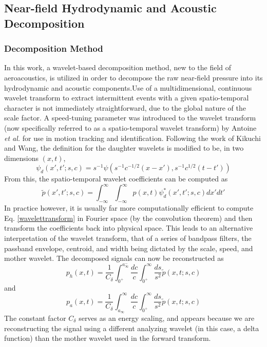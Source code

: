 \documentclass[english]{aiaa-tc}
\begin{document}
\subsection{Near-field Hydrodynamic and Acoustic Decomposition}
\subsubsection{Decomposition Method}
In this work, a wavelet-based decomposition method, new to the field of aeroacoustics, is utilized in order to decompose the raw near-field pressure into its hydrodynamic and acoustic components.Use of a multidimensional, continuous wavelet transform to extract intermittent events with a given spatio-temporal character is not immediately straightforward, due to the global nature of the scale factor. A speed-tuning parameter was introduced to the wavelet transform (now specifically referred to as a spatio-temporal wavelet transform) by Antoine {\em et al.}\cite{Antoine2004} for use in motion tracking and identification. Following the work of Kikuchi and Wang\cite{Kikuchi2010}, the definition for the daughter wavelets is modified to be, in two dimensions $(x,t)$, 
\begin{equation}
\psi_{d}(x',t';s,c)=s^{-1}\psi \left( s^{-1}c^{-1/2}(x-x'),s^{-1}c^{1/2}(t-t') \right)
\end{equation}
From this, the spatio-temporal wavelet coefficients can be computed as
\begin{equation}\label{wavelettransform}
\tilde{p}(x',t';s,c)=\int_{-\infty}^{\infty}\int_{-\infty}^{\infty}p(x,t)\psi^{*}_{d}(x',t';s,c)dx'dt' 
\end{equation}
In practice however, it is usually far more computationally efficient to compute Eq. \ref{wavelettransform} in Fourier space (by the convolution theorem) and then transform the coefficients back into physical space. This leads to an alternative interpretation of the wavelet transform, that of a series of bandpass filters, the passband envelope, centroid, and width being dictated by the scale, speed, and mother wavelet\cite{Torrence1998,Farge1992,Antoine2004}. The decomposed signals can now be reconstructed as
\begin{equation}
p_{h}(x,t) = \frac{1}{C_{\delta}}\int_{0^{+}}^{a_{\infty}^{-}}\frac{dc}{c}\int_{0^{+}}^{\infty}\frac{ds}{s^{2}}\tilde{p}(x,t;s,c)
\end{equation}
and
\begin{equation}
p_{a}(x,t) = \frac{1}{C_{\delta}}\int_{a_{\infty}}^{\infty}\frac{dc}{c}\int_{0^{+}}^{\infty}\frac{ds}{s^{2}}\tilde{p}(x,t;s,c)
\end{equation}
The constant factor $C_{\delta}$ serves as an energy scaling, and appears because we are reconstructing the signal using a different analyzing wavelet (in this case, a delta function) than the mother wavelet used in the forward transform\cite{Torrence1998,Farge1992}.
\end{document}
